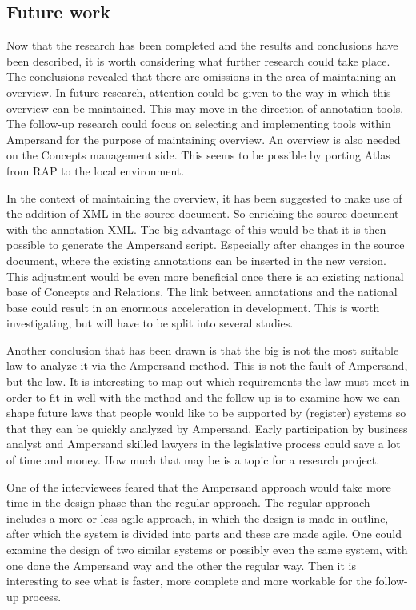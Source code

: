 \subsection{Future work}\label{future_work}
Now that the research has been completed and the results and conclusions have been described, it is worth considering what further research could take place.
The conclusions revealed that there are omissions in the area of maintaining an overview.
In future research, attention could be given to the way in which this overview can be maintained.
This may move in the direction of annotation tools.
The follow-up research could focus on selecting and implementing tools within Ampersand for the purpose of maintaining overview.
An overview is also needed on the Concepts management side.
This seems to be possible by porting Atlas from RAP to the local environment.

In the context of maintaining the overview, it has been suggested to make use of the addition of XML in the source document.
So enriching the source document with the annotation XML.
The big advantage of this would be that it is then possible to generate the Ampersand script.
Especially after changes in the source document, where the existing annotations can be inserted in the new version.
This adjustment would be even more beneficial once there is an existing national base of Concepts and Relations.
The link between annotations and the national base could result in an enormous acceleration in development.
This is worth investigating, but will have to be split into several studies.

Another conclusion that has been drawn is that the \acrshort{big} is not the most suitable law to analyze it via the Ampersand method.
This is not the fault of Ampersand, but the law.
It is interesting to map out which requirements the law must meet in order to fit in well with the method and the follow-up is to examine how we can shape future laws that people would like to be supported by (register) systems so that they can be quickly analyzed by Ampersand.
Early participation by business analyst and Ampersand skilled lawyers in the legislative process could save a lot of time and money.
How much that may be is a topic for a research project.

One of the interviewees feared that the Ampersand approach would take more time in the design phase than the regular approach.
The regular approach includes a more or less agile approach, in which the design is made in outline, after which the system is divided into parts and these are made agile.
One could examine the design of two similar systems or possibly even the same system, with one done the Ampersand way and the other the regular way.
Then it is interesting to see what is faster, more complete and more workable for the follow-up process.

